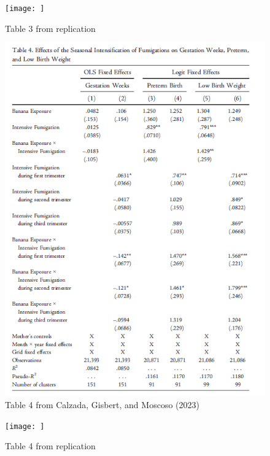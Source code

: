 \documentclass[hyperref={pdfpagelabels=false}]{beamer}
\begin{document}
	\begin{frame}{}
		
		\begin{figure}
			\centering
			\texttt{[image: ]}
			\caption{Table 3 from  replication}
			\label{fig:enter-label}
		\end{figure}
		
		
	\end{frame}
	
	\begin{frame}{}
		
		\begin{figure}
			\centering
			\includegraphics[scale=0.4]{figures-paper/table4.png}
			\caption{Table 4 from Calzada, Gisbert, and Moscoso (2023)}
			\label{fig:enter-label}
		\end{figure}
		
		
	\end{frame}
	
	
	\begin{frame}{}
		
		\begin{figure}
			\centering
			\texttt{[image: ]}
			\caption{Table 4 from  replication}
			\label{fig:enter-label}
		\end{figure}
		
		
	\end{frame}
	
\end{document}
